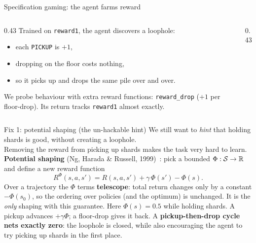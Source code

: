 \begin{frame}{Specification gaming: the agent farms reward}
\begin{columns}
\begin{column}{0.43\textwidth}
Trained on \texttt{reward1}, the agent discovers a loophole:
\begin{itemize}
  \item each \texttt{PICKUP} is $+1$,
  \item dropping on the floor costs nothing,
  \item so it picks up and drops the same pile over and over.
\end{itemize}
\pause
We probe behaviour with extra reward functions: \texttt{reward\_drop} ($+1$ per floor-drop). Its return tracks \texttt{reward1} almost exactly.
\end{column}
\begin{column}{0.43\textwidth}
\centering
{}
\end{column}
\end{columns}
\end{frame}

\begin{frame}{Fix 1: potential shaping (the un-hackable hint)}
We still want to \emph{hint} that holding shards is good, without creating a loophole. \\
Removing the reward from picking up shards makes the task very hard to learn.
\vfill
\textbf{Potential shaping} (Ng, Harada \& Russell, 1999)~: pick a bounded $\Phi: \mathcal{S} \to \mathbb{R}$ and define a new reward function
\[
  R^\Phi(s,a,s') = R(s,a,s') + \gamma\,\Phi(s') - \Phi(s).
\]
\pause
Over a trajectory the $\Phi$ terms \textbf{telescope}: total return changes only by a constant $-\Phi(s_0)$, so the ordering over policies (and the optimum) is unchanged. It is the \emph{only} shaping with this guarantee.
\pause
\vfill
Here $\Phi(s) = 0.5$ while holding shards. A pickup advances $+\gamma\Phi$; a floor-drop gives it back. A \textbf{pickup-then-drop cycle nets exactly zero}: the loophole is closed, while also encouraging the agent
to try picking up shards in the first place.
\end{frame}


